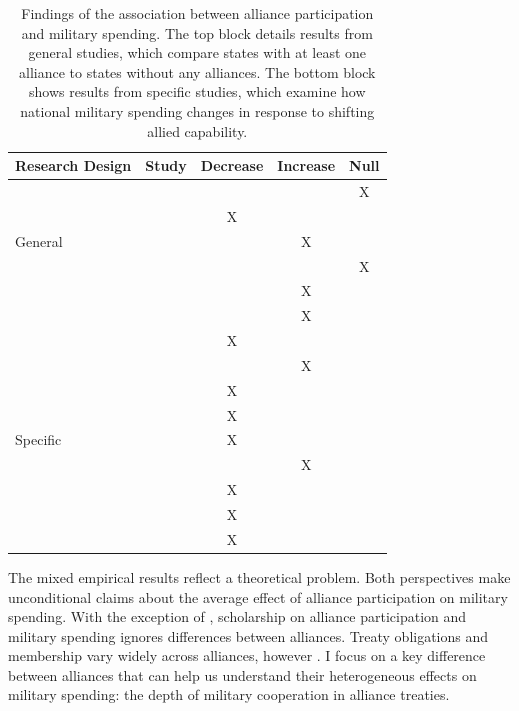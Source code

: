 \documentclass[12pt]{article}
\begin{document}
\begin{table}[hbt!]
\begin{center}
\begin{tabular}{lcccc}
   Research Design  & Study & Decrease & Increase & Null \\
\hline
\multirow{5}{*}{General} & \citet{MostSiverson1987} &  &  & X \\
 & \citet{Conybeare1994}    & X & &  \\
 & \citet{Diehl1994}        &  & X &  \\
 & \citet{Goldsmith2003}    &  &  & X \\
 & \citet{MorganPalmer2006} &  & X & \\ 
 & \citet{QuirozFlores2011} &  & X &  \\ 
 & \citet{OnealWhatley1996} & X &  & \\ 
 \hline
 \multirow{7}{*}{Specific} &\citet{ConybeareSandler1990} &   & X &  \\
 &\citet{BarnettLevy1991} & X  &  &  \\
 &\citet{Morrow1993}      & X  &  &  \\
 &\citet{Sorokin1994}     & X  &  &  \\
 &\citet{Chenetal1996}    &  & X &  \\
 &\citet{PluemperNeumayer2015} & X &  &  \\
 &\citet{GeorgeSandler2017} & X &  &  \\
 &\citet{OlsonZeckhauser1966} & X & & \\
\hline
\end{tabular}
\caption{Findings of the association between alliance participation and military spending. The top block details results from general studies, which compare states with at least one alliance to states without any alliances. The bottom block shows results from specific studies, which examine how national military spending changes in response to shifting allied capability.}
\label{tab:results-sum}
\end{center} 
\end{table}


The mixed empirical results reflect a theoretical problem. 
Both perspectives make unconditional claims about the average effect of alliance participation on military spending.  
With the exception of \citet{DigiuseppePoast2018}, scholarship on alliance participation and military spending ignores differences between alliances.
Treaty obligations and membership vary widely across alliances, however \citep{Leedsetal2002}. 
I focus on a key difference between alliances that can help us understand their heterogeneous effects on military spending: the depth of military cooperation in alliance treaties.
\end{document}
